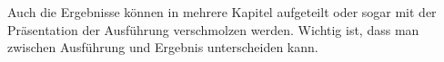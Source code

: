 Auch die Ergebnisse können in mehrere Kapitel aufgeteilt oder sogar mit der Präsentation der Ausführung verschmolzen werden.
Wichtig ist, dass man zwischen Ausführung und Ergebnis unterscheiden kann.
